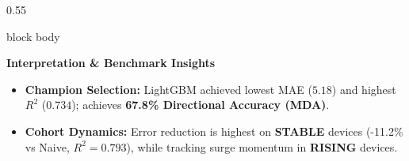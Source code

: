 \documentclass[aspectratio=169, 10pt]{beamer}
\newenvironment{card}[1][]{%
        \begin{beamercolorbox}[rounded=true,shadow=false,wd=\linewidth,sep=3.5pt,#1]{block body}%
        \fontsize{7.8pt}{9.8pt}\selectfont%
    }{%
        \end{beamercolorbox}%
    }
\begin{document}
\begin{frame}[t]
        \vspace{-0.15cm}                                                                                                                                                                               
        \begin{columns}[T]                                                                                                                                                                             
            \begin{column}{0.55\textwidth}                                                                                                                                                             
                \begin{card}                                                                                                                                                                           
                    {\fontsize{7.5pt}{9pt}\selectfont \textbf{\color{NavyPrimary}Interpretation \& Benchmark Insights}}\\[0.04cm]                                                                      
                    \begin{itemize}\setlength{\itemsep}{1.5pt}                                                                                                                                         
                        \item \textbf{Champion Selection:} LightGBM achieved lowest MAE ($5.18$) and highest $R^2$ ($0.734$); achieves \textbf{67.8\% Directional Accuracy (MDA)}.                     
                        \item \textbf{Cohort Dynamics:} Error reduction is highest on \textbf{STABLE} devices (-11.2\% vs Naive, $R^2=0.793$), while tracking surge momentum in \textbf{RISING} devices.
                    \end{itemize}                                                                                                                                                                      
                \end{card}                                                                                                                                                                             
            \end{column}                                                                                                                                                                               
                                                                                                                                                                                                       

\end{columns}
\end{frame}
\end{document}
